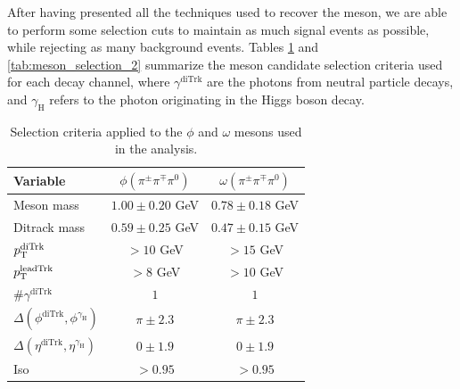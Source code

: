 After having presented all the techniques used to recover the meson, we are able to perform some selection cuts to maintain as much signal events as possible, while rejecting as many background events. Tables \ref{tab:meson_selection_1} and \ref{tab:meson_selection_2} summarize the meson candidate selection criteria used for each decay channel, where $\gamma^{\text{diTrk}}$ are the photons from neutral particle decays, and $\gamma_\text{H}$ refers to the photon originating in the Higgs boson decay.
\begin{table}[!ht]
    \centering
    \begin{tabular}{|l|c|c|}
        \hline
        \cellcolor{lightgray}Variable & \cellcolor{lightgray}$\phi(\pi^{\pm}\pi^{\mp}\pi^{0})$ & \cellcolor{lightgray}$\omega(\pi^{\pm}\pi^{\mp}\pi^{0})$ \\ \hline
        Meson mass                                              &$1.00\pm0.20$ GeV  &$0.78\pm0.18$ GeV    \\
        Ditrack mass                                            &$0.59\pm0.25$ GeV  &$0.47\pm0.15$ GeV      \\
        $p_\text{T}^{\text{diTrk}}$                                    &$>10$ GeV          &$>15$ GeV              \\
        $p_\text{T}^{\text{leadTrk}}$                                  &$>8$ GeV           &$>10$ GeV               \\
        $\#\gamma^{\text{diTrk}}$                               &$1$                &$1$                   \\
        $\Delta(\phi^{\text{diTrk}}, \phi^{\gamma_\text{H}})$   &$\pi\pm2.3$    &$\pi\pm2.3$        \\
        $\Delta(\eta^{\text{diTrk}}, \eta^{\gamma_\text{H}})$   &$0\pm1.9$          &$0\pm1.9$              \\
        Iso                                                     &$>0.95$            &$>0.95$                \\
        \hline
        \end{tabular}
    \caption{Selection criteria applied to the $\phi$ and $\omega$ mesons used in the analysis.}
    \label{tab:meson_selection_1}
\end{table}

